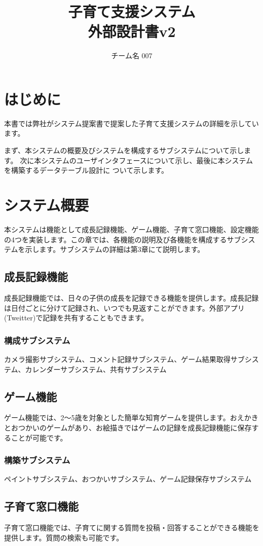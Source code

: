 \documentclass[a4j]{jarticle}
\title{
\vspace{30mm}
{\bf 子育て支援システム}
\\
\vspace{5mm}
{\bf 外部設計書v2\\
}
\vspace{120mm}
}
\author{
\vspace{5mm}
チーム名 007\\
\vspace{5mm}
}
\begin{document}
\maketitle
\tableofcontents
\newpage

\section{はじめに}
本書では弊社がシステム提案書で提案した子育て支援システムの詳細を示しています。

まず、本システムの概要及びシステムを構成するサブシステムについて示します。
次に本システムのユーザインタフェースについて示し、最後に本システムを構築するデータテーブル設計に
ついて示します。

\section{システム概要}
本システムは機能として成長記録機能、ゲーム機能、子育て窓口機能、設定機能の4つを実装します。この章では、各機能の説明及び各機能を構成するサブシステムを示します。サブシステムの詳細は第3章にて説明します。

\subsection{成長記録機能}
成長記録機能では、日々の子供の成長を記録できる機能を提供します。成長記録は日付ごとに分けて記録され、いつでも見返すことができます。外部アプリ(Tweitter)で記録を共有することもできます。
\subsubsection*{構成サブシステム}
\noindent カメラ撮影サブシステム、コメント記録サブシステム、ゲーム結果取得サブシステム、カレンダーサブシステム、共有サブシステム

\subsection{ゲーム機能}
ゲーム機能では、2〜5歳を対象とした簡単な知育ゲームを提供します。おえかきとおつかいのゲームがあり、お絵描きではゲームの記録を成長記録機能に保存することが可能です。
\subsubsection*{構築サブシステム}
\noindent ペイントサブシステム、おつかいサブシステム、ゲーム記録保存サブシステム

\subsection{子育て窓口機能}
子育て窓口機能では、子育てに関する質問を投稿・回答することができる機能を提供します。質問の検索も可能です。
\end{document}

